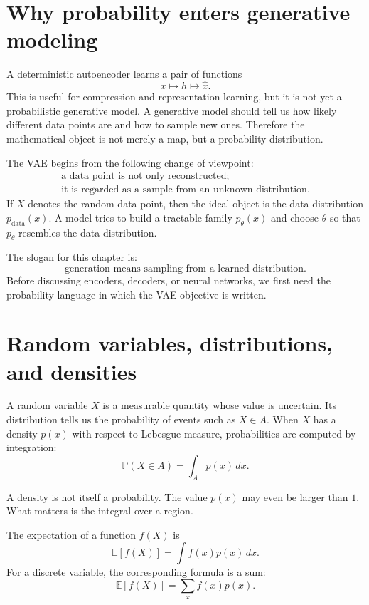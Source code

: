 
\section{Why probability enters generative modeling}

A deterministic autoencoder learns a pair of functions
\[
  x\longmapsto h\longmapsto \widehat x.
\]
This is useful for compression and representation learning, but it is not yet a probabilistic generative model.  A generative model should tell us how likely different data points are and how to sample new ones.  Therefore the mathematical object is not merely a map, but a probability distribution.

The VAE begins from the following change of viewpoint:
\[
\begin{array}{c}
  \text{a data point is not only reconstructed;}\\
  \text{it is regarded as a sample from an unknown distribution.}
\end{array}
\]
If \(X\) denotes the random data point, then the ideal object is the data distribution \(p_{\mathrm{data}}(x)\).  A model tries to build a tractable family \(p_\theta(x)\) and choose \(\theta\) so that \(p_\theta\) resembles the data distribution.

The slogan for this chapter is:
\[
  \text{generation means sampling from a learned distribution.}
\]
Before discussing encoders, decoders, or neural networks, we first need the probability language in which the VAE objective is written.

\section{Random variables, distributions, and densities}

A random variable \(X\) is a measurable quantity whose value is uncertain.  Its distribution tells us the probability of events such as \(X\in A\).  When \(X\) has a density \(p(x)\) with respect to Lebesgue measure, probabilities are computed by integration:
\[
  \mathbb P(X\in A)=\int_A p(x)\,dx.
\]

A density is not itself a probability.  The value \(p(x)\) may even be larger than \(1\).  What matters is the integral over a region.

The expectation of a function \(f(X)\) is
\[
  \mathbb E[f(X)]=\int f(x)p(x)\,dx.
\]
For a discrete variable, the corresponding formula is a sum:
\[
  \mathbb E[f(X)]=\sum_x f(x)p(x).
\]

